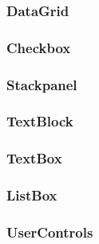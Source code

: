 \subsubsection{DataGrid}

\subsubsection{Checkbox}

\subsubsection{Stackpanel}

\subsubsection{TextBlock}

\subsubsection{TextBox}

\subsubsection{ListBox}

\subsubsection{UserControls}


